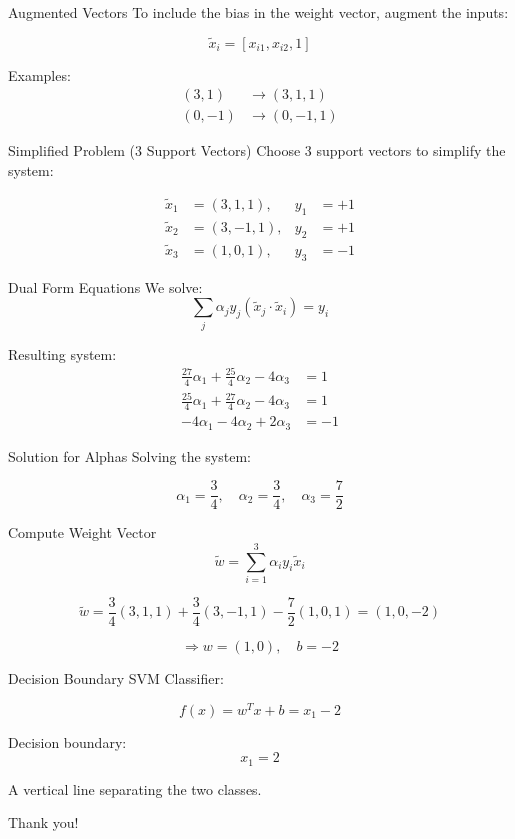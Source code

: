 \documentclass{beamer}
\begin{document}
\begin{frame}{Augmented Vectors}
To include the bias in the weight vector, augment the inputs:

\[
\tilde{x}_i = [x_{i1}, x_{i2}, 1]
\]

Examples:
\begin{align*}
(3, 1) &\rightarrow (3, 1, 1) \\
(0, -1) &\rightarrow (0, -1, 1)
\end{align*}
\end{frame}

\begin{frame}{Simplified Problem (3 Support Vectors)}
Choose 3 support vectors to simplify the system:

\[
\begin{aligned}
\tilde{x}_1 &= (3, 1, 1), & y_1 &= +1 \\
\tilde{x}_2 &= (3, -1, 1), & y_2 &= +1 \\
\tilde{x}_3 &= (1, 0, 1), & y_3 &= -1
\end{aligned}
\]
\end{frame}

\begin{frame}{Dual Form Equations}
We solve:
\[
\sum_j \alpha_j y_j (\tilde{x}_j \cdot \tilde{x}_i) = y_i
\]

Resulting system:
\[
\begin{aligned}
\frac{27}{4} \alpha_1 + \frac{25}{4} \alpha_2 - 4 \alpha_3 &= 1 \\
\frac{25}{4} \alpha_1 + \frac{27}{4} \alpha_2 - 4 \alpha_3 &= 1 \\
-4 \alpha_1 - 4 \alpha_2 + 2 \alpha_3 &= -1
\end{aligned}
\]
\end{frame}

\begin{frame}{Solution for Alphas}
Solving the system:

\[
\boxed{
\alpha_1 = \frac{3}{4}, \quad
\alpha_2 = \frac{3}{4}, \quad
\alpha_3 = \frac{7}{2}
}
\]
\end{frame}

\begin{frame}{Compute Weight Vector}
\[
\tilde{w} = \sum_{i=1}^{3} \alpha_i y_i \tilde{x}_i
\]

\[
\tilde{w} = \frac{3}{4}(3, 1, 1) + \frac{3}{4}(3, -1, 1) - \frac{7}{2}(1, 0, 1)
= (1, 0, -2)
\]

\[
\Rightarrow w = (1, 0), \quad b = -2
\]
\end{frame}

\begin{frame}{Decision Boundary}
SVM Classifier:

\[
f(x) = w^T x + b = x_1 - 2
\]

Decision boundary:
\[
\boxed{x_1 = 2}
\]

A vertical line separating the two classes.
\end{frame}

\begin{frame}[standout]
    Thank you!
\end{frame}
\end{document}

